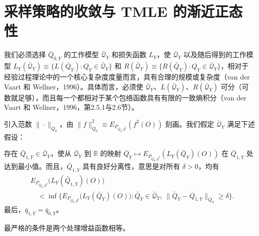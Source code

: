 \section{采样策略的收敛与 TMLE 的渐近正态性}

我们必须选择 $\bar Q_{0,Y}$ 的工作模型 $\bar{\mathcal Q}_Y$ 和损失函数 $L_Y$，使 $\bar{\mathcal Q}_Y$ 以及随后得到的工作模型 $L_Y(\bar{\mathcal Q}_Y)\equiv\{L(\bar Q_Y):Q_Y\in\bar{\mathcal Q}_Y\}$ 和 $R(\bar{\mathcal Q}_Y)\equiv\{R(\bar Q_Y):Q_Y\in\bar{\mathcal Q}_Y\}$，相对于经验过程理论中的一个核心复杂度度量而言，具有合理的规模或复杂度（van der Vaart 和 Wellner，1996）。具体而言，必须使 $\bar{\mathcal Q}_Y$、$L(\bar{\mathcal Q}_Y)$、$R(\bar{\mathcal Q}_Y)$ 可分（可数就足够），而且每一个都相对于某个包络函数具有有限的一致熵积分（van der Vaart 和 Wellner，1996，第2.5.1与2.6节）。

引入范数 $\|\cdot\|_{Q_0}$，由 $\|f\|_{Q_0}^2\equiv E_{P_{Q_0,g^b}}(f^2(O))$ 刻画。我们假定 $\bar{\mathcal Q}_Y$ 满足下述假设：
\begin{description}[leftmargin=3em,labelwidth=2.5em]
\item[A1.] 存在 $\bar Q_{1,Y}\in\bar{\mathcal Q}_Y$，使从 $\bar{\mathcal Q}_Y$ 到 $\mathbb R$ 的映射 $\bar Q_Y\mapsto E_{P_{Q_0,g^b}}(L_Y(\bar Q_Y)(O))$ 在 $\bar Q_{1,Y}$ 处达到最小值。而且，$\bar Q_{1,Y}$ 具有良好分离性，意思是对所有 $\delta>0$，均有
\[
 \begin{aligned}
 &E_{P_{Q_0,g^b}}\bigl(L_Y(\bar Q_{1,Y})(O)\bigr)\\
 &\quad<\inf\bigl\{E_{P_{Q_0,g^b}}\bigl(L_Y(\bar Q_Y)(O)\bigr):
 \bar Q_Y\in\bar{\mathcal Q}_Y,\ \|\bar Q_Y-\bar Q_{1,Y}\|_{Q_0}\geq\delta\bigr\}.
 \end{aligned}
\]
最后，$\bar q_{1,Y}=\bar q_{0,Y}$。
\end{description}
最严格的条件是两个处理增益函数相等。

